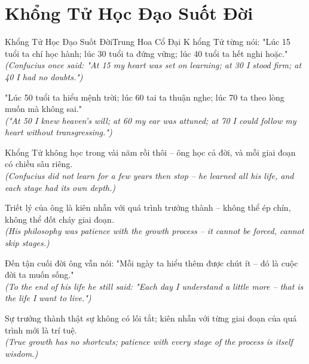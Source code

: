 \section{Khổng Tử Học Đạo Suốt Đời}
\begin{truyen}{Khổng Tử Học Đạo Suốt Đời}{Trung Hoa Cổ Đại}
K hổng Tử từng nói: "Lúc 15 tuổi ta chí học hành; lúc 30 tuổi ta đứng vững; lúc 40 tuổi ta hết nghi hoặc."\\
\textit{(Confucius once said: "At 15 my heart was set on learning; at 30 I stood firm; at 40 I had no doubts.")}

"Lúc 50 tuổi ta hiểu mệnh trời; lúc 60 tai ta thuận nghe; lúc 70 ta theo lòng muốn mà không sai."\\
\textit{("At 50 I knew heaven's will; at 60 my ear was attuned; at 70 I could follow my heart without transgressing.")}

Khổng Tử không học trong vài năm rồi thôi -- ông học cả đời, và mỗi giai đoạn có chiều sâu riêng.\\
\textit{(Confucius did not learn for a few years then stop -- he learned all his life, and each stage had its own depth.)}

Triết lý của ông là kiên nhẫn với quá trình trưởng thành -- không thể ép chín, không thể đốt cháy giai đoạn.\\
\textit{(His philosophy was patience with the growth process -- it cannot be forced, cannot skip stages.)}

Đến tận cuối đời ông vẫn nói: "Mỗi ngày ta hiểu thêm được chút ít -- đó là cuộc đời ta muốn sống."\\
\textit{(To the end of his life he still said: "Each day I understand a little more -- that is the life I want to live.")}

\end{truyen}
\begin{baihoc}
  Sự trưởng thành thật sự không có lối tắt; kiên nhẫn với từng giai đoạn của quá trình mới là trí tuệ.\\
  \textit{(True growth has no shortcuts; patience with every stage of the process is itself wisdom.)}
\end{baihoc}


